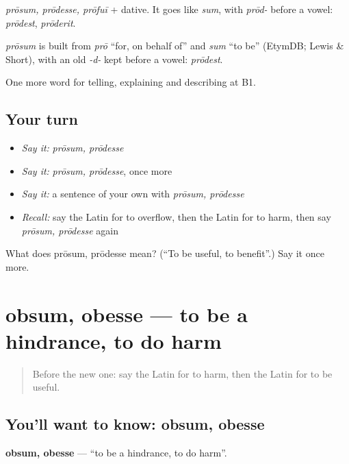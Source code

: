\emph{prōsum, prōdesse, prōfuī} + dative. It goes like \emph{sum}, with \emph{prōd-} before a vowel: \emph{prōdest}, \emph{prōderit}.

\begin{cousinweb}
\emph{prōsum} is built from \emph{prō} \textquotedblleft{}for, on behalf of\textquotedblright{} and \emph{sum} \textquotedblleft{}to be\textquotedblright{} (EtymDB; Lewis \& Short), with an old \emph{-d-} kept before a vowel: \emph{prōdest}.
\end{cousinweb}

\begin{grammarlens}[title={What you've built}]
One more word for telling, explaining and describing at B1.
\end{grammarlens}

\subsection*{Your turn}
\begin{itemize}
\raggedright
  \item \emph{Say it:} \emph{prōsum, prōdesse}
  \item \emph{Say it:} \emph{prōsum, prōdesse}, once more
  \item \emph{Say it:} a sentence of your own with \emph{prōsum, prōdesse}
  \item \emph{Recall:} say the Latin for to overflow, then the Latin for to harm, then say \emph{prōsum, prōdesse} again
\end{itemize}

\begin{tcolorbox}[breakable,colback=teal!4,colframe=teal!35!black,title={Before you move on}]
What does prōsum, prōdesse mean? (\textquotedblleft{}To be useful, to benefit\textquotedblright{}.) Say it once more.
\end{tcolorbox}
\section[obsum, obesse]{obsum, obesse — to be a hindrance, to do harm}

\label{lesson:LA-C374-obsum}



\begin{quote}
Before the new one: say the Latin for to harm, then the Latin for to be useful.
\end{quote}

\subsection*{You'll want to know: obsum, obesse}
\textbf{obsum, obesse} — \textquotedblleft{}to be a hindrance, to do harm\textquotedblright{}.

